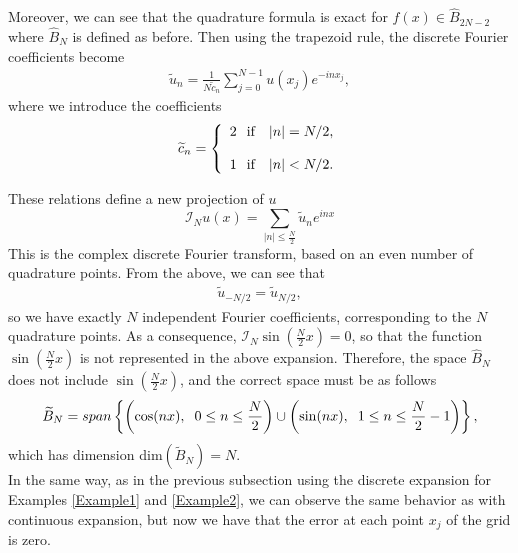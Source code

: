 	Moreover, we can see that the quadrature formula is exact for $f(x) \in \hat{B}_{2N-2}$ where $\hat{B}_N$ is defined as before. Then using the trapezoid rule, the discrete Fourier coefficients become
	\begin{align}
	\label{coeficients_IN}
	    \widetilde{u}_n = \frac{1}{N \widetilde{c}_n}  \displaystyle \sum_{j = 0}^{N - 1} u(x_j) e^{-in x_j},
	\end{align}
	where we introduce the coefficients
	\begin{align}
	\label{constants_IN}	
	    \widetilde{c}_n = \left \lbrace \begin{array}{ll}
	    2  \hspace{0.25cm}\text{if} & |n| =  N/2, \\
	    \\
	    1  \hspace{0.25cm} \text{if} & |n| < N/2.
	\end{array}  \right .
	\end{align}

	\noindent These relations define a new projection of $u$
	\begin{equation}
	\label{collocation_operator_even}
		\mathcal{I}_N u(x) =  \displaystyle \sum_{ |n| \leq \frac {N}{2}} \widetilde{u}_n e^{inx}
	\end{equation}
	This is the complex discrete Fourier transform, based on an even number of quadrature points. From the above, we can see that
	\begin{align*}
	    \widetilde{u}_{-N/2} = \widetilde{u}_{N/2},
	\end{align*}
	so we have exactly $N$ independent Fourier coefficients, corresponding to the $N$ quadrature points. As a consequence, $\mathcal{I}_N \sin( \frac{N}{2} x) = 0$, so that the function $\sin( \frac{N}{2} x)$ is not represented in the above expansion. Therefore, the space $\hat{B}_N$ does not include $\sin( \frac{N}{2} x)$, and the correct space must be as follows
	\begin{align*}
	    \widetilde{B}_N = span\left\{\left(\cos(nx), \hspace{0.2cm} 0 \leq n \leq \frac{N}{2} \right)\cup  \left(\sin(nx), \hspace{0.2cm} 1 \leq n \leq \frac{N}{2} - 1 \right)\right\},
	\end{align*}
	which has dimension dim$(\widetilde{B}_N) = N$.\\
	
	\noindent In the same way, as in the previous subsection using the discrete expansion for Examples \ref{Example1} and \ref{Example2}, we can observe the same behavior as with continuous expansion, but now we have that the error at each point $x_j$ of the grid is zero.

